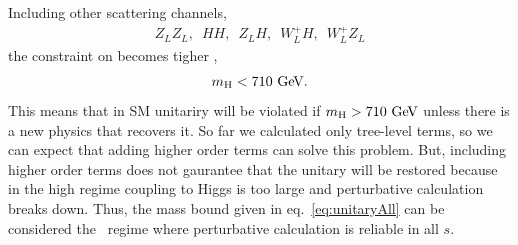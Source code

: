 Including other scattering channels, 
\begin{eqnarray} 
Z_LZ_L, \,\,\, HH, \,\,\, Z_LH, \,\,\, W_L^+H, \,\,\, W^+_LZ_L 
\end{eqnarray} 
the constraint on \mHi{} becomes tigher \cite{Djouadi20081}, 
\begin{eqnarray} 
\label{eq:unitaryAll}
m_{\mathrm{H}} < 710~\mathrm{Ge\kern -0.1em V}.
\end{eqnarray}
This means that in SM unitariry will be violated if $m_{\mathrm{H}}>710~\mathrm{Ge\kern -0.1em V}$
unless there is a new physics that recovers it. 
So far we calculated only tree-level terms, so we can expect that adding 
higher order terms can solve this problem. But, including higher order 
terms does not gaurantee that the unitary will be restored because 
in the high \mHi{} regime coupling to Higgs is too large and perturbative 
calculation breaks down. Thus, the mass bound given in eq.~\ref{eq:unitaryAll}  
can be considered the \mHi~regime where perturbative calculation is reliable 
in all $s$.

